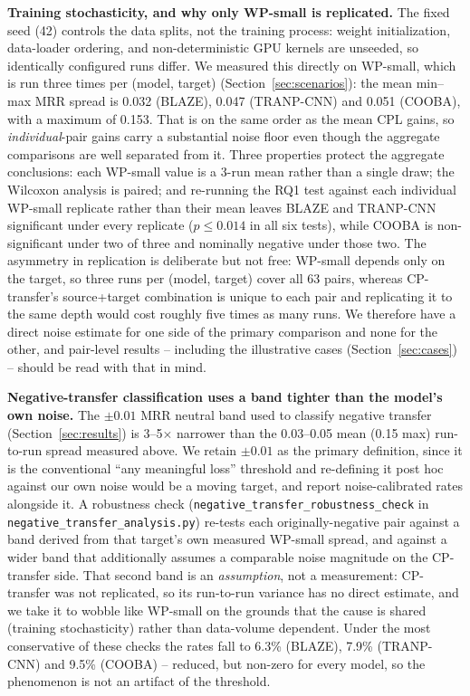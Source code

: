 \documentclass[a4paper,fleqn]{cas-dc}
\begin{document}
\textbf{Training stochasticity, and why only WP-small is replicated.}
The fixed seed (42) controls the data splits, not the training process:
weight initialization, data-loader ordering, and non-deterministic GPU
kernels are unseeded, so identically configured runs differ. We measured this
directly on WP-small, which is run three times per (model, target)
(Section~\ref{sec:scenarios}): the mean min--max MRR spread is 0.032 (BLAZE),
0.047 (TRANP-CNN) and 0.051 (COOBA), with a maximum of 0.153. That is on the
same order as the mean CPL gains, so \emph{individual}-pair gains carry a
substantial noise floor even though the aggregate comparisons are well
separated from it. Three properties protect the aggregate conclusions: each
WP-small value is a 3-run mean rather than a single draw; the Wilcoxon
analysis is paired; and re-running the RQ1 test against each individual
WP-small replicate rather than their mean leaves BLAZE and TRANP-CNN
significant under every replicate ($p \leq 0.014$ in all six tests), while
COOBA is non-significant under two of three and nominally negative under
those two. The asymmetry in replication is deliberate but not free:
WP-small depends only on the target, so three runs per (model, target) cover
all 63 pairs, whereas CP-transfer's source+target combination is unique to
each pair and replicating it to the same depth would cost roughly five times
as many runs. We therefore have a direct noise estimate for one side of the
primary comparison and none for the other, and pair-level results --
including the illustrative cases (Section~\ref{sec:cases}) -- should be read
with that in mind.

\textbf{Negative-transfer classification uses a band tighter than the model's
own noise.} The $\pm 0.01$ MRR neutral band used to classify negative transfer
(Section~\ref{sec:results}) is 3--5$\times$ narrower than the 0.03--0.05 mean
(0.15 max) run-to-run spread measured above. We retain $\pm 0.01$ as the
primary definition, since it is the conventional ``any meaningful loss''
threshold and re-defining it post hoc against our own noise would be a moving
target, and report noise-calibrated rates alongside it. A robustness check
(\texttt{negative\_transfer\_robustness\_check} in
\texttt{negative\_transfer\_analysis.py}) re-tests each originally-negative
pair against a band derived from that target's own measured WP-small spread,
and against a wider band that additionally assumes a comparable noise
magnitude on the CP-transfer side. That second band is an \emph{assumption},
not a measurement: CP-transfer was not replicated, so its run-to-run variance
has no direct estimate, and we take it to wobble like WP-small on the grounds
that the cause is shared (training stochasticity) rather than data-volume
dependent. Under the most conservative of these checks the rates fall to
6.3\% (BLAZE), 7.9\% (TRANP-CNN) and 9.5\% (COOBA) -- reduced, but non-zero
for every model, so the phenomenon is not an artifact of the threshold.
\end{document}
